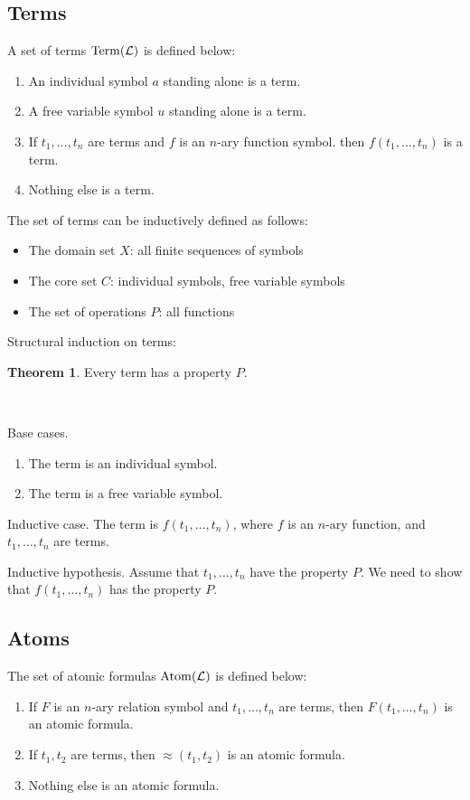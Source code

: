 \documentclass[11pt]{article}
\makeatletter
\theoremstyle{definition}
\newtheorem*{thm*}{Theorem}
\newenvironment{pf}[1][\proofname]{\par
  \pushQED{\qed}%
  \normalfont \topsep0\p@\relax
  \trivlist
  \item[\hskip\labelsep\itshape
  #1\@addpunct{.}]\ignorespaces
}{%
  \popQED\endtrivlist\@endpefalse
}
\makeatother
\begin{document}
\subsection{Terms}
A set of terms ${\rm Term}(\mathcal{L})$ is defined below:\vspace{-0.25cm}
\begin{enumerate}
    \item An individual symbol $a$ standing alone is a term.
    \item A free variable symbol $u$ standing alone is a term.
    \item If $t_1, \dots, t_n$ are terms and $f$ is an $n$-ary function symbol. then $f(t_1, \dots, t_n)$ is a term.
    \item Nothing else is a term.
\end{enumerate}
\vspace{-0.25cm}
The set of terms can be inductively defined as follows:\vspace{-0.25cm}
\begin{itemize}
    \item The domain set $X$: all finite sequences of symbols
    \item The core set $C$: individual symbols, free variable symbols
    \item The set of operations $P$: all functions
\end{itemize}
\vspace{-0.25cm}
Structural induction on terms:
\begin{thm*}
Every term has a property $P$.
\end{thm*}
\begin{pf}~

{\sc Base cases.} \vspace{-0.25cm}
\begin{enumerate}[(1)] 
\item The term is an individual symbol.
\item The term is a free variable symbol.
\end{enumerate}
\vspace{-0.25cm}
{\sc Inductive case.} The term is $f(t_1, \dots, t_n)$, where $f$ is an $n$-ary function, and $t_1, \dots, t_n$ are terms.

{\sc Inductive hypothesis.} Assume that $t_1, \dots, t_n$ have the property $P$. We need to show that $f(t_1, \dots, t_n)$ has the property $P$.
\end{pf}

\subsection{Atoms}
The set of atomic formulas ${\rm Atom}(\mathcal{L})$ is defined below:\vspace{-0.25cm}
\begin{enumerate}
    \item If $F$ is an $n$-ary relation symbol and $t_1, \dots, t_n$ are terms, then $F(t_1, \dots, t_n)$ is an atomic formula.
    \item If $t_1, t_2$ are terms, then $\approx (t_1, t_2)$ is an atomic formula.
    \item Nothing else is an atomic formula.
\end{enumerate}
\end{document}

